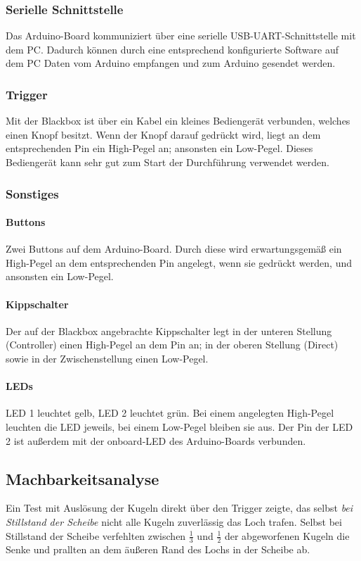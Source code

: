 \documentclass{kis}
\begin{document}
\subsubsection{Serielle Schnittstelle}
Das Arduino-Board kommuniziert über eine serielle USB-UART-Schnittstelle mit dem PC. Dadurch können durch eine entsprechend konfigurierte Software auf dem PC Daten vom Arduino empfangen und zum Arduino gesendet werden.

\subsubsection{Trigger}
Mit der Blackbox ist über ein Kabel ein kleines Bediengerät verbunden, welches einen Knopf besitzt. Wenn der Knopf darauf gedrückt wird, liegt an dem entsprechenden Pin ein High-Pegel an; ansonsten ein Low-Pegel. Dieses Bediengerät kann sehr gut zum Start der Durchführung verwendet werden. 

\subsubsection{Sonstiges}
\paragraph{Buttons}
Zwei Buttons auf dem Arduino-Board. Durch diese wird erwartungsgemäß ein High-Pegel an dem entsprechenden Pin angelegt, wenn sie gedrückt werden, und ansonsten ein Low-Pegel.
\paragraph{Kippschalter}
Der auf der Blackbox angebrachte Kippschalter legt in der unteren Stellung (\glqq Controller\grqq) einen High-Pegel an dem Pin an; in der oberen Stellung (\glqq Direct\grqq) sowie in der Zwischenstellung einen Low-Pegel.
\paragraph{LEDs}
LED 1 leuchtet gelb, LED 2 leuchtet grün. Bei einem angelegten High-Pegel leuchten die LED jeweils, bei einem Low-Pegel bleiben sie aus. Der Pin der LED 2 ist außerdem mit der onboard-LED des Arduino-Boards verbunden.

\subsection{Machbarkeitsanalyse}
Ein Test mit Auslösung der Kugeln direkt über den Trigger zeigte, das selbst \emph{bei Stillstand der Scheibe} nicht alle Kugeln zuverlässig das Loch trafen. Selbst bei Stillstand der Scheibe verfehlten zwischen $\frac13$ und $\frac12$ der abgeworfenen Kugeln die Senke und prallten an dem äußeren Rand des Lochs in der Scheibe ab.
\end{document}

